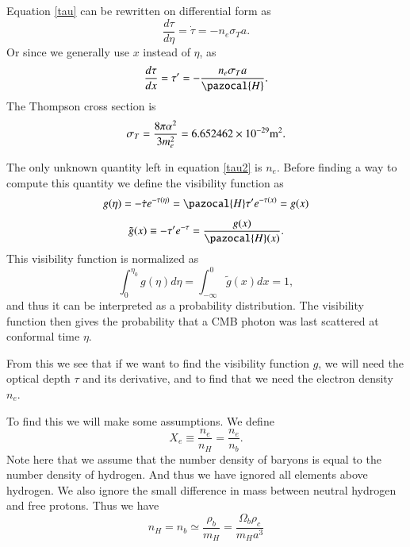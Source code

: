 \documentclass{aa}   %
\begin{document}
Equation \ref{tau} can be rewritten on differential form as
\begin{equation}\label{tau2}
 \frac{d\tau}{d\eta}  = \dot{\tau}= - n_e\sigma_T a.
\end{equation}
Or since we generally use $x$ instead of $\eta$, as
\begin{equation}
 \frac{d\tau}{dx} = \tau' = -\frac{n_e\sigma_T a}{\pazocal{H}}.
\end{equation}
The Thompson cross section is
\begin{equation}
 \sigma_T =  \frac{8\pi\alpha^2}{3m_e^2} = 6.652462\times10^{-29} \textmd{m}^2.
\end{equation}


The only unknown quantity left in equation \ref{tau2} is $n_e$. 
Before finding a way to compute this quantity we define the visibility function as
\begin{equation}
 g(\eta) = -\dot{\tau}e^{-\tau(\eta)} = \pazocal{H}\tau'e^{-\tau(x)} = g(x)
\end{equation}
\begin{equation}
 \tilde{g}(x) \equiv -\tau'e^{-\tau}=\frac{g(x)}{\pazocal{H}(x)}. 
\end{equation}
This visibility function is normalized as
\begin{equation}
 \int_0^{\eta_0} g(\eta)d\eta = \int_{-\infty}^0 \tilde{g}(x)dx = 1,
\end{equation}
and thus it can be interpreted as a probability distribution. The visibility function then gives the probability that a CMB photon was last scattered at conformal time $\eta$.

From this we see that if we want to find the visibility function $g$, we will need the optical depth $\tau$ and its derivative, and to find that we need the electron density $n_e$.

To find this we will make some assumptions.
We define 
\begin{equation}
 X_e \equiv \frac{n_e}{n_H} = \frac{n_e}{n_b}.
\end{equation}
Note here that we assume that the number density of baryons is equal to the number density of hydrogen. And thus we have ignored all elements above hydrogen. We also ignore the small difference in mass between neutral hydrogen and free protons. Thus we have
\begin{equation}
 n_H = n_b \simeq \frac{\rho_b}{m_H} = \frac{\Omega_b \rho_c}{m_H a^3}
\end{equation}
\end{document}
